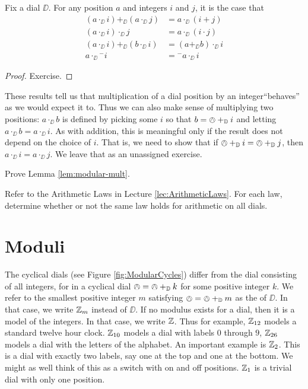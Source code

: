 \begin{lem}\label{lem:modular-mult}
	Fix a dial $\DD$. For any position $a$ and integers $i$ and $j$, it is the case that 
	\begin{align*} 
		(a \cdot_\DD i)+_\DD (a\cdot_\DD j) &= a\cdot_\DD (i+j)\\
		(a\cdot_\DD i)\cdot_\DD j &= a\cdot_\DD (i\cdot j)\\
		(a\cdot_\DD i) +_\DD (b\cdot_\DD i) &= (a+_\DD b)\cdot_\DD i\\
		a\cdot_\DD{}^-i &= {}^-a \cdot_\DD i
	\end{align*}

\begin{proof}
	Exercise.
\end{proof}
\end{lem}

These results tell us that multiplication of a dial position by an integer``behaves'' as we would expect it to. Thus we can also make sense of multiplying two positions: $a \cdot_\DD b$ is defined by picking some $i$ so that $b = \owedge +_{\mathbb D} i$ and letting $a\cdot_\DD b = a\cdot_\DD i$. As with addition, this is meaningful only if the result does not depend on the choice of $i$. That is, we need to show that if $\owedge +_{\mathbb D} i = \owedge +_{\mathbb D} j$, then $a\cdot_\DD i = a\cdot_\DD j$. We leave that as an unassigned exercise.

\begin{exer}
	\begin{exercise}
		\item Prove Lemma \ref{lem:modular-mult}.
		\item Refer to the Arithmetic Laws in Lecture \ref{lec:ArithmeticLaws}. For each law, determine whether or not the same law holds for arithmetic on all dials.
	\end{exercise}
\end{exer}


\section*{Moduli}

The cyclical dials (see Figure \ref{fig:ModularCycles}) differ from the dial consisting of all integers, for in a cyclical dial $\owedge = \owedge +_{\mathbb D} k$ for some positive integer $k$. We refer to the smallest positive integer $m$ satisfying $\owedge = \owedge +_{\mathbb D} m$ as the  of $\DD$. In that case, we write ${\mathbb Z}_m$ instead of $\DD$. If no modulus exists for a dial, then it is a model of the integers. In that case, we write ${\mathbb Z}$. 
Thus for example, ${\mathbb Z}_{12}$ models a standard twelve hour clock. ${\mathbb Z}_{10}$ models a dial with labels $0$ through $9$, ${\mathbb Z}_{26}$ models a dial with the letters of the alphabet. An important example is ${\mathbb Z}_2$. This is a dial with exactly two labels, say one at the top and one at the bottom. We might as well think of this as a switch with on and off positions. ${\mathbb Z}_1$ is a trivial dial with only one position.

